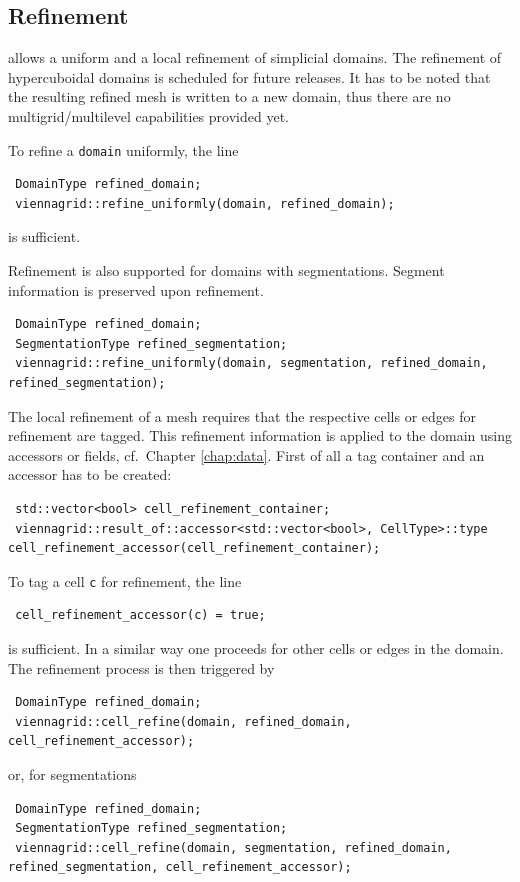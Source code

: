 

 \subsection{Refinement}
 {\ViennaGridversion} allows a uniform and a local refinement of simplicial domains. The refinement of hypercuboidal domains is scheduled for future releases.
It has to be noted that the resulting refined mesh is written to a new domain, thus there are no multigrid/multilevel capabilities provided yet.

 To refine a \lstinline|domain| uniformly, the line
 \begin{lstlisting}
 DomainType refined_domain;
 viennagrid::refine_uniformly(domain, refined_domain);
 \end{lstlisting}
 is sufficient.
 
 Refinement is also supported for domains with segmentations. Segment information is preserved upon refinement.
 \begin{lstlisting}
 DomainType refined_domain;
 SegmentationType refined_segmentation;
 viennagrid::refine_uniformly(domain, segmentation, refined_domain, refined_segmentation);
 \end{lstlisting}

 The local refinement of a mesh requires that the respective cells or edges for refinement are tagged. This refinement information is applied to the domain using accessors or fields, cf.~Chapter \ref{chap:data}.
 First of all a tag container and an accessor has to be created:
 \begin{lstlisting}
 std::vector<bool> cell_refinement_container;
 viennagrid::result_of::accessor<std::vector<bool>, CellType>::type cell_refinement_accessor(cell_refinement_container);
 \end{lstlisting}
 
 
 To tag a cell \lstinline|c| for refinement, the line
 \begin{lstlisting}
 cell_refinement_accessor(c) = true;
 \end{lstlisting}
 is sufficient. In a similar way one proceeds for other cells or edges in the domain. The refinement process is then triggered by
 \begin{lstlisting}
 DomainType refined_domain;
 viennagrid::cell_refine(domain, refined_domain, cell_refinement_accessor);
 \end{lstlisting}
 or, for segmentations
 \begin{lstlisting}
 DomainType refined_domain;
 SegmentationType refined_segmentation;
 viennagrid::cell_refine(domain, segmentation, refined_domain, refined_segmentation, cell_refinement_accessor);
 \end{lstlisting}

